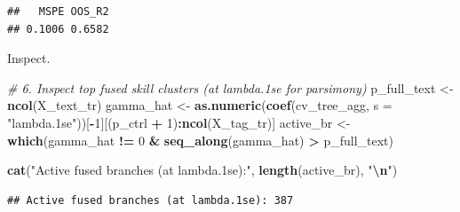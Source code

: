 \documentclass[
]{article}
\newenvironment{Shaded}{\begin{snugshade}}{\end{snugshade}}
\newcommand{\AttributeTok}[1]{\textcolor[rgb]{0.13,0.29,0.53}{#1}}
\newcommand{\CommentTok}[1]{\textcolor[rgb]{0.56,0.35,0.01}{\textit{#1}}}
\newcommand{\ConstantTok}[1]{\textcolor[rgb]{0.56,0.35,0.01}{#1}}
\newcommand{\ControlFlowTok}[1]{\textcolor[rgb]{0.13,0.29,0.53}{\textbf{#1}}}
\newcommand{\DecValTok}[1]{\textcolor[rgb]{0.00,0.00,0.81}{#1}}
\newcommand{\FunctionTok}[1]{\textcolor[rgb]{0.13,0.29,0.53}{\textbf{#1}}}
\newcommand{\NormalTok}[1]{#1}
\newcommand{\OtherTok}[1]{\textcolor[rgb]{0.56,0.35,0.01}{#1}}
\newcommand{\SpecialCharTok}[1]{\textcolor[rgb]{0.81,0.36,0.00}{\textbf{#1}}}
\newcommand{\StringTok}[1]{\textcolor[rgb]{0.31,0.60,0.02}{#1}}
\begin{document}
\begin{verbatim}
##   MSPE OOS_R2 
## 0.1006 0.6582
\end{verbatim}

Inspect.

\begin{Shaded}
\begin{Highlighting}[]
\CommentTok{\# 6. Inspect top fused skill clusters (at lambda.1se for parsimony)}
\NormalTok{p\_full\_text }\OtherTok{\textless{}{-}} \FunctionTok{ncol}\NormalTok{(X\_text\_tr)}
\NormalTok{gamma\_hat   }\OtherTok{\textless{}{-}} \FunctionTok{as.numeric}\NormalTok{(}\FunctionTok{coef}\NormalTok{(cv\_tree\_agg, }\AttributeTok{s =} \StringTok{"lambda.1se"}\NormalTok{))[}\SpecialCharTok{{-}}\DecValTok{1}\NormalTok{][(p\_ctrl }\SpecialCharTok{+} \DecValTok{1}\NormalTok{)}\SpecialCharTok{:}\FunctionTok{ncol}\NormalTok{(X\_tag\_tr)]}
\NormalTok{active\_br   }\OtherTok{\textless{}{-}} \FunctionTok{which}\NormalTok{(gamma\_hat }\SpecialCharTok{!=} \DecValTok{0} \SpecialCharTok{\&} \FunctionTok{seq\_along}\NormalTok{(gamma\_hat) }\SpecialCharTok{\textgreater{}}\NormalTok{ p\_full\_text)}

\FunctionTok{cat}\NormalTok{(}\StringTok{"Active fused branches (at lambda.1se):"}\NormalTok{, }\FunctionTok{length}\NormalTok{(active\_br), }\StringTok{"}\SpecialCharTok{\textbackslash{}n}\StringTok{"}\NormalTok{)}
\end{Highlighting}
\end{Shaded}

\begin{verbatim}
## Active fused branches (at lambda.1se): 387
\end{verbatim}

\begin{Shaded}
\end{Shaded}
\end{document}
